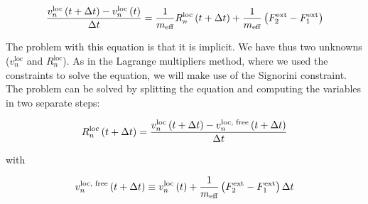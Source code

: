 \begin{equation}
\frac{v_n^{\text{loc}}\left(t+\Delta t\right)- v_n^{\text{loc}}\left(t\right)}{\Delta t}
=
\frac{1}{m_\text{eff}} R_n^{\text{loc}} \left(t+\Delta t\right) + \frac{1}{m_{\text{eff}}} \left(F_2^{\text{ext}}-F_1^{\text{ext}}\right)
\end{equation}




The problem with this equation is that it is implicit. We have thus two unknowns ($v_n^{\text{loc}}$  and $R_n^{\text{loc}}$). As in the Lagrange multipliers method, where we used the constraints to solve the equation, we will make use of the Signorini constraint. The problem can be solved by splitting the equation and computing the variables in two separate steps:


\begin{equation}
R_n^{\text{loc}}\left(t+\Delta t\right)
=
\frac{v_n^{\text{loc}}\left(t+\Delta t\right) - v_n^{\text{loc, free}}\left(t+\Delta t\right)}{\Delta t}
\label{eq:r_loc}
\end{equation}

with

\begin{equation*}
v_n^{\text{loc, free}}\left(t+\Delta t\right)
\equiv
v_n^{\text{loc}}\left(t\right) + \frac{1}{m_{\text{eff}}} \left(F_2^{\text{ext}}-F_1^{\text{ext}}\right) \Delta t
\end{equation*}


